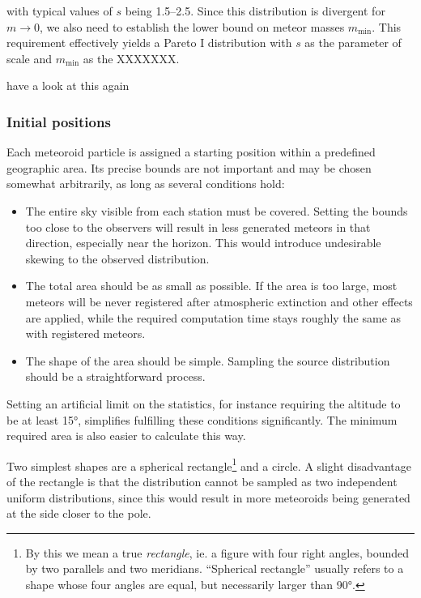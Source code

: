             with typical values of $s$ being \numrange{1.5}{2.5}. Since this distribution is divergent for $m \to 0$,
            we also need to establish the lower bound on meteor masses $m_\mathrm{min}$. This requirement effectively yields
            a Pareto I distribution with $s$ as the parameter of scale and $m_\mathrm{min}$ as the XXXXXXX.
            
            have a look at this again
            
        \subsubsection{Initial positions}
            Each meteoroid particle is assigned a starting position within a predefined geographic area. Its precise bounds
            are not important and may be chosen somewhat arbitrarily, as long as several conditions hold:        
            \begin{itemize}
                \item The entire sky visible from each station must be covered. Setting the bounds too close to the observers
                    will result in less generated meteors in that direction, especially near the horizon. This would
                    introduce undesirable skewing to the observed distribution.
                \item The total area should be as small as possible. If the area is too large, most meteors will be never registered
                    after atmospheric extinction and other effects are applied, while the required computation time
                    stays roughly the same as with registered meteors.
                \item The shape of the area should be simple. Sampling the source distribution should be a straightforward process.
            \end{itemize}
        
            Setting an artificial limit on the statistics, for instance requiring the altitude to be at least \ang{15},
            simplifies fulfilling these conditions significantly. The minimum required area is also easier to calculate this way.

            Two simplest shapes are a spherical rectangle\footnote{By this we mean a true \emph{rectangle}, ie. a figure with four right angles,
            bounded by two parallels and two meridians. ``Spherical rectangle'' usually refers to a shape whose
            four angles are equal, but necessarily larger than \ang{90}.} and a circle.
            A slight disadvantage of the rectangle is that the distribution cannot be sampled as two independent
            uniform distributions, since this would result in more meteoroids being generated at the side closer to the pole.


